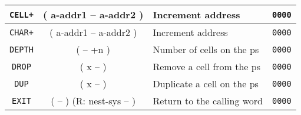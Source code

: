 \begin{center}
\begin{longtable}{|c|c|l|c|}
      \texttt{CELL+}                          &
      ( a-addr1 -- a-addr2 )                  &
      Increment address                       &
      \texttt{0000}                           \\ \hline
                                              
                                              
      \texttt{CHAR+}                          &
      ( a-addr1 -- a-addr2 )                  &
      Increment address                       &
      \texttt{0000}                           \\ \hline


      \texttt{DEPTH}                          &
      ( -- +n )                               &
      Number of cells on the \gls{ps}         &
      \texttt{0000}                           \\ \hline
                                              
      \texttt{DROP}                           &
      ( x -- )                                &
      Remove a cell from the \gls{ps}         &
      \texttt{0000}                           \\ \hline
                                              
      \texttt{DUP}                            &
      ( x -- )                                &
      Duplicate a cell on the \gls{ps}        &
      \texttt{0000}                           \\ \hline
                                              
      \texttt{EXIT}                           &
      ( -- ) (R: nest-sys -- )                &
      Return to the calling word              &
      \texttt{0000}                           \\ \hline


\end{longtable}
\end{center}
